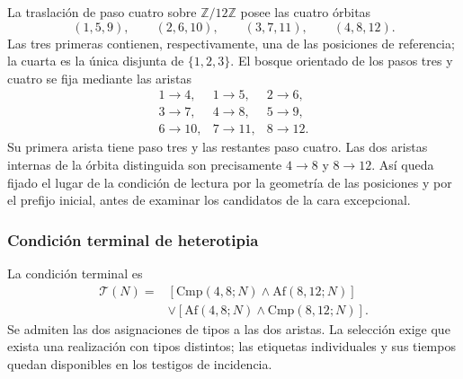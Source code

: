 La traslación de paso cuatro sobre $\mathbb Z/12\mathbb Z$ posee las
cuatro órbitas
\[
 (1,5,9),\qquad(2,6,10),\qquad(3,7,11),\qquad(4,8,12).
\]
Las tres primeras contienen, respectivamente, una de las posiciones de
referencia; la cuarta es la única disjunta de $\{1,2,3\}$. El bosque
orientado de los pasos tres y cuatro se fija mediante las aristas
\[
 \begin{array}{lll}
 1\to4,&1\to5,&2\to6,\\
 3\to7,&4\to8,&5\to9,\\
 6\to10,&7\to11,&8\to12.
 \end{array}
\]
Su primera arista tiene paso tres y las restantes paso cuatro. Las dos
aristas internas de la órbita distinguida son precisamente
$4\to8$ y $8\to12$. Así queda fijado el lugar de la condición de
lectura por la geometría de las posiciones y por el prefijo inicial,
antes de examinar los candidatos de la cara excepcional.

\subsubsection{Condición terminal de heterotipia}

La condición terminal es
\begin{equation}
 \begin{split}
 \mathcal T(N)={}&
 [\mathrm{Cmp}(4,8;N)\wedge\mathrm{Af}(8,12;N)]\\
 &\vee[\mathrm{Af}(4,8;N)\wedge\mathrm{Cmp}(8,12;N)].
 \end{split}
 \label{eq:kdes-heterotipia}
\end{equation}
Se admiten las dos asignaciones de tipos a las dos aristas. La
selección exige que exista una realización con tipos distintos; las
etiquetas individuales y sus tiempos quedan disponibles en los
testigos de incidencia.

